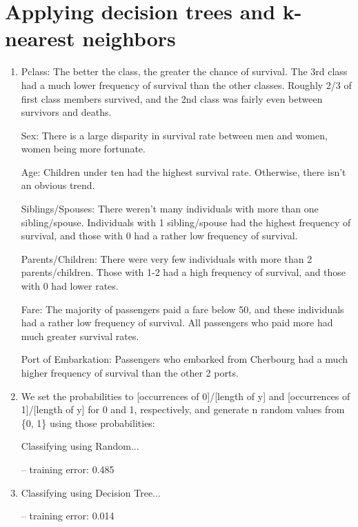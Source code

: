 \documentclass[11pt]{article}
\newcommand{\solution}[1]{{{\color{black}{\bf Solution:} {#1}}}}
\begin{document}
\section{Applying decision trees and k-nearest neighbors}
\begin{enumerate}
\item %
\solution{

Pclass:
The better the class, the greater the chance of survival. The 3rd class had a much lower frequency of survival than the other classes. Roughly 2/3 of first class members survived, and the 2nd class was fairly even between survivors and deaths.

Sex:
There is a large disparity in survival rate between men and women, women being more fortunate.

Age:
Children under ten had the highest survival rate. Otherwise, there isn’t an obvious trend.

Siblings/Spouses:
There weren’t many individuals with more than one sibling/spouse. Individuals with 1 sibling/spouse had the highest frequency of survival, and those with 0 had a rather low frequency of survival.

Parents/Children:
There were very few individuals with more than 2 parents/children. Those with 1-2 had a high frequency of survival, and those with 0 had lower rates.

Fare:
The majority of passengers paid a fare below 50, and these individuals had a rather low frequency of survival. All passengers who paid more had much greater survival rates.

Port of Embarkation:
Passengers who embarked from Cherbourg had a much higher frequency of survival than the other 2 ports.
}
\vspace{0.5cm}

\item %
\solution{
We set the probabilities to [occurrences of 0]/[length of y] and [occurrences of 1]/[length of y] for 0 and 1, respectively, and generate n random values from \{0, 1\} using those probabilities:

Classifying using Random...

	-- training error: 0.485
}
\vspace{0.5cm}

\item %
\solution{

Classifying using Decision Tree...

	-- training error: 0.014
}
\vspace{0.5cm}


\end{enumerate}
\end{document}
